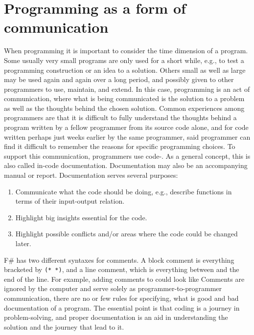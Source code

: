 \documentclass[springer.tex]{subfiles}
\begin{document}
\section{Programming as a form of communication}
When programming it is important to consider the time dimension of a program. Some usually very small programs are only used for a short while, e.g., to test a programming construction or an idea to a solution. Others small as well as large may be used again and again over a long period, and possibly given to other programmers to use, maintain, and extend. In this case, programming is an act of communication, where what is being communicated is the solution to a problem as well as the thoughts behind the chosen solution. Common experiences among programmers are that it is difficult to fully understand the thoughts behind a program written by a fellow programmer from its source code alone, and for code written perhaps just weeks earlier by the same programmer, said programmer can find it difficult to remember the reasons for specific programming choices. To support this communication, programmers use code-. As a general concept, this is also called in-code documentation. Documentation may also be an accompanying manual or report. Documentation serves several purposes:
\begin{enumerate}
\item Communicate what the code should be doing, e.g., describe functions in terms of their input-output relation.
\item Highlight big insights essential for the code.
\item Highlight possible conflicts and/or areas where the code could be changed later.
\end{enumerate}
F\# has two different syntaxes for comments. A block comment is everything bracketed by \lstinline{(* *)}, and a line comment, which is everything between \lexeme{//} and the end of the line. For example, adding comments to  could look like 
% 
%
Comments are ignored by the computer and serve solely as programmer-to-programmer communication, there are no or few rules for specifying, what is good and bad documentation of a program. The essential point is that coding is a journey in problem-solving, and proper documentation is an aid in understanding the solution and the journey that lead to it.
\end{document}
